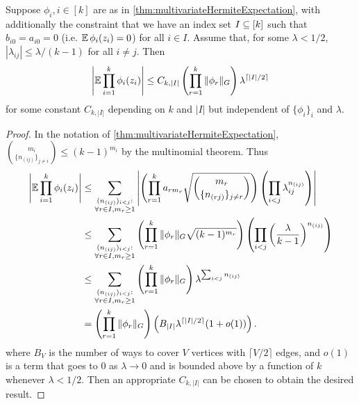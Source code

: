 \documentclass[main.tex]{subfiles}
\begin{document}
\begin{lemma}\label{lemma:smallRhoMomentBound}
Suppose $\phi_i, i\in[k]$ are as in \cref{thm:multivariateHermiteExpectation}, with additionally the constraint that we have an index set $I \subseteq [k]$ such that $b_{i0} = a_{i0} = 0$ (i.e. $\operatorname*{\mathbb{E}} \phi_i(z_i) = 0$) for all $i \in I$.
Assume that, for some $\lambda < 1/2 $, $|\lambda_{ij}| \le \lambda/(k-1)$ for all $i \ne j$.
Then
\begin{align*}
    \left|\operatorname*{\mathbb{E}} \prod_{i=1}^k \phi_i(z_i)\right| \le
    C_{k,|I|} \left( \prod_{r=1}^k \|\phi_r\|_G\right) 
        \lambda^{\lceil |I|/2\rceil}
\end{align*}
for some constant $C_{k, |I|}$ depending on $k$ and $|I|$ but independent of $\{\phi_i\}_i$ and $\lambda$.
\end{lemma}
\begin{proof}
In the notation of \cref{thm:multivariateHermiteExpectation}, $\binom{m_i}{\{n_{(ij)}\}_{j \ne i}} \le (k-1)^{m_i}$ by the multinomial theorem.
Thus
\begin{align*}
    \left|\operatorname*{\mathbb{E}} \prod_{i=1}^k \phi_i(z_i)\right|
    &\le
        \sum_{\substack{(n_{(ij)})_{i<j}:\\\forall r\in I, m_r \ge 1}}
        \left|
        \left( \prod_{r=1}^k a_{r m_r} \sqrt{\binom{m_r}{\{n_{(rj)}\}_{j \ne r}}} \right) 
        \left( \prod_{i<j} \lambda_{ij}^{n_{(ij)}}
            \right)
        \right|
        \\
    &\le
        \sum_{\substack{(n_{(ij)})_{i<j}:\\\forall r \in I, m_r \ge 1}}
        \left( \prod_{r=1}^k \|\phi_r\|_G \sqrt{(k-1)^{m_r}} \right) 
        \left( \prod_{i<j} \left( \frac{\lambda}{k-1} \right)^{n_{(ij)}}
            \right)
        \\
    &\le
        \sum_{\substack{(n_{(ij)})_{i<j}:\\\forall r \in I, m_r \ge 1}}
        \left( \prod_{r=1}^k \|\phi_r\|_G  \right) 
        \lambda^{\sum_{i<j} n_{(ij)}}
        \\
    &=
        \left( \prod_{r=1}^k \|\phi_r\|_G\right) 
        \left( B_{|I|} \lambda^{\lceil |I|/2\rceil} (1 + o(1)) \right)
        .
\end{align*}
where $B_V$ is the number of ways to cover $V$ vertices with $\lceil V/2 \rceil$ edges, and
$o(1)$ is a term that goes to 0 as $\lambda \to 0$ and is bounded above by a function of $k$ whenever $\lambda < 1/2$.
Then an appropriate $C_{k, |I|}$ can be chosen to obtain the desired result.
\end{proof}
\end{document}
